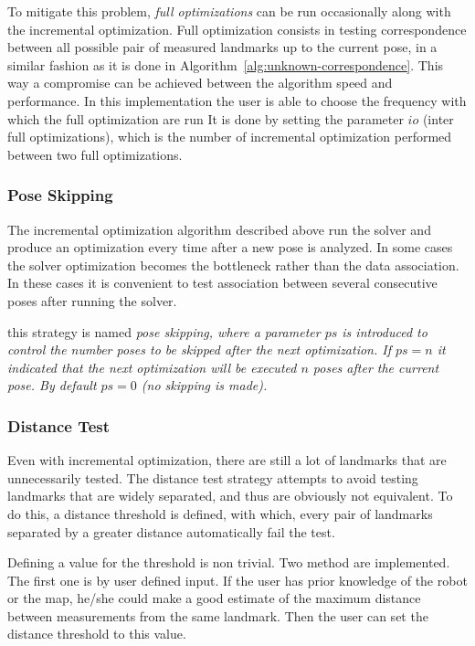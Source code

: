 To mitigate this problem, \emph{full optimizations} can be run occasionally along with the incremental optimization. Full optimization consists in testing correspondence between all possible pair of measured landmarks up to the current pose, in a similar fashion as it is done in Algorithm~\ref{alg:unknown-correspondence}. This way a compromise can be achieved between the algorithm speed and performance. In this implementation the user is able to choose the frequency with which the full optimization are run It is done by setting the parameter $io$ (inter full optimizations), which is the number of incremental optimization performed between two full optimizations. 

\subsubsection{Pose Skipping}

The incremental optimization algorithm described above run the solver and produce an optimization every time after a new pose is analyzed. In some cases the solver optimization becomes the bottleneck rather than the data association. In these cases it is convenient to  test association between several consecutive poses after running the solver.

this strategy is named \it{pose skipping}, where a parameter $ps$ is introduced to control the number poses to be skipped after the next optimization. If $ps=n$ it indicated that the next optimization will be executed $n$ poses after the current pose. By default $ps=0$ (no skipping is made).    

\subsubsection{Distance Test}

Even with incremental optimization, there are still a lot of landmarks that are unnecessarily tested. The distance test strategy attempts to avoid testing landmarks that are widely separated, and thus are obviously not equivalent. To do this, a distance threshold is defined, with which, every pair of landmarks separated by a greater distance automatically fail the test. 

Defining a value for the threshold is non trivial. Two method are implemented. The first one is by user defined input. If the user has prior knowledge of the robot or the map, he/she could make a good estimate of the maximum distance between measurements from the same landmark. Then the user can set the distance threshold to this value.

